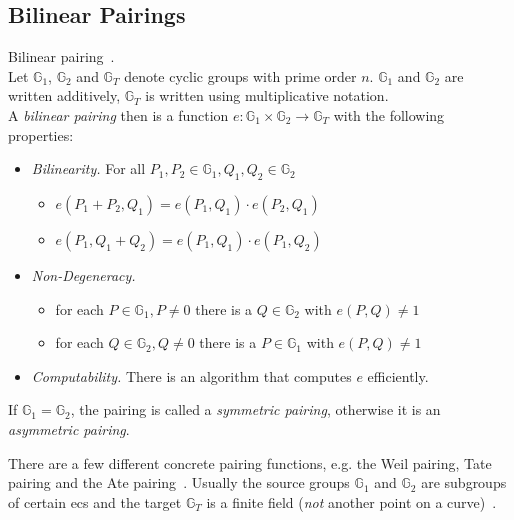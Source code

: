 \subsection{Bilinear Pairings}\label{sec:bilinear-pairings}

\begin{definition}Bilinear pairing~\cite{kiraz_still_2016}.\\
    Let $\mathbb{G}_1$, $\mathbb{G}_2$ and $\mathbb{G}_T$ denote cyclic groups with prime order $n$.
$\mathbb{G}_1$ and $\mathbb{G}_2$ are written additively, $\mathbb{G}_T$ is written using multiplicative notation.\\
    A \emph{bilinear pairing} then is a function $e: \mathbb{G}_1 \times \mathbb{G}_2 \rightarrow \mathbb{G}_T$ with the following properties:
    \begin{itemize}
        \item \emph{Bilinearity.} For all $P_1, P_2 \in \mathbb{G}_1, Q_1, Q_2 \in \mathbb{G}_2$
        \begin{itemize}
            \item $e(P_1+P_2, Q_1) = e(P_1,Q_1)\cdot e(P_2,Q_1)$
            \item $e(P_1, Q_1+Q_2)=e(P_1,Q_1)\cdot e(P_1,Q_2)$
        \end{itemize}
        \item \emph{Non-Degeneracy.}
        \begin{itemize}
            \item for each $P \in \mathbb{G}_1, P \neq 0$ there is a $Q \in \mathbb{G}_2$ with $e(P, Q) \neq 1$
            \item for each $Q \in \mathbb{G}_2, Q \neq 0$ there is a $P \in \mathbb{G}_1$ with $e(P, Q) \neq 1$
        \end{itemize}
        \item \emph{Computability.} There is an algorithm that computes $e$ efficiently.
    \end{itemize}
    If $\mathbb{G}_1 = \mathbb{G}_2$, the pairing is called a \emph{symmetric pairing}, otherwise it is an \emph{asymmetric pairing}.
\end{definition}

There are a few different concrete pairing functions, e.g. the Weil pairing, Tate pairing and the Ate pairing~\cite{kiraz_still_2016}.
Usually the source groups $\mathbb{G}_1$ and $\mathbb{G}_2$ are subgroups of certain \glspl{ec} \cite{kiraz_still_2016} and the target $\mathbb{G}_T$ is a finite field (\emph{not} another point on a curve)~\cite{blake_advances_2005}.

